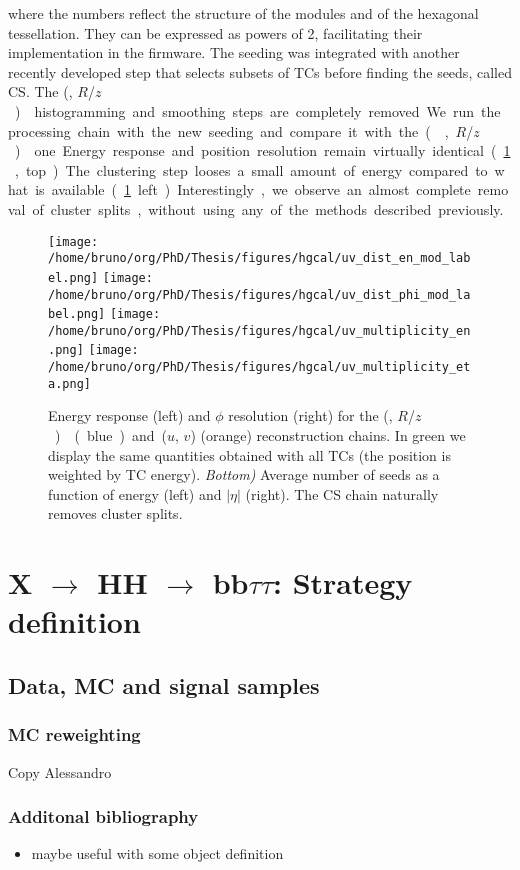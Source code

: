 \documentclass[11pt]{article}
\newcommand{\reshhbbtt}{X $\rightarrow$ HH $\rightarrow$ bb$\tau\tau$}
\newcommand{\coordsa}{(\si{\azi}, \si{\rz})}
\newcommand{\coordsb}{($u$, $v$)}
\newcommand{\rz}{$R$/$z$}
\begin{document}
\noindent where the numbers reflect the structure of the modules and of the hexagonal tessellation.
They can be expressed as powers of 2, facilitating their implementation in the firmware.
The seeding was integrated with another recently developed step that selects subsets of \acp{TC} before finding the seeds, called \ac{CS}.
The \coordsa{} histogramming and smoothing steps are completely removed.
We run the processing chain with the new seeding and compare it with the \coordsa{} one.
Energy response and position resolution remain virtually identical (\cref{fig:uv_dist}, top).
The clustering step looses a small amount of energy compared to what is available (\cref{fig:uv_dist} left).
Interestingly, we observe an almost complete removal of cluster splits, without using any of the methods described previously.

\begin{figure}
\texttt{[image: /home/bruno/org/PhD/Thesis/figures/hgcal/uv\_dist\_en\_mod\_label.png]}
\texttt{[image: /home/bruno/org/PhD/Thesis/figures/hgcal/uv\_dist\_phi\_mod\_label.png]}
\texttt{[image: /home/bruno/org/PhD/Thesis/figures/hgcal/uv\_multiplicity\_en.png]}
\texttt{[image: /home/bruno/org/PhD/Thesis/figures/hgcal/uv\_multiplicity\_eta.png]}
\caption{\label{fig:uv_dist}Energy response (left) and \(\phi\) resolution (right) for the \coordsa{} (blue) and \coordsb{} (orange) reconstruction chains. In green we display the same quantities obtained with all \acp{TC} (the position is weighted by \ac{TC} energy). \emph{Bottom)} Average number of seeds as a function of energy (left) and \(|\eta|\) (right). The CS chain naturally removes cluster splits.}
\end{figure}
\section{\reshhbbtt{}: Strategy definition}
\label{sec:orgc2ad5d6}
\label{sec::bbtautau}
\subsection{Data, MC and signal samples}
\label{sec:orgffee213}
\label{sec:samples}
\subsubsection{MC reweighting}
\label{sec:org19a8917}
Copy Alessandro
\subsubsection{Additonal bibliography}
\label{sec:org7840a6a}
\begin{itemize}
\item maybe useful with some object definition \cite{signal_processing}
\end{itemize}
\end{document}
